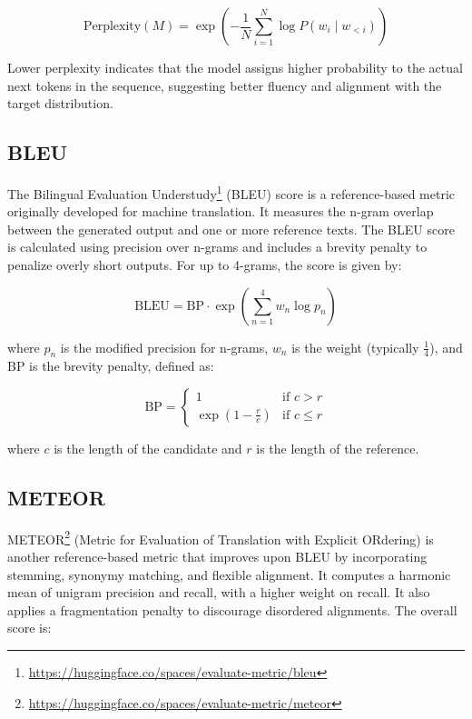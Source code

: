 \begin{equation}
  \text{Perplexity}(M) = \exp\left(-\frac{1}{N} \sum_{i=1}^{N} \log P(w_i \mid w_{<i})\right)
\end{equation}

Lower perplexity indicates that the model assigns higher probability to the actual
next tokens in the sequence, suggesting better fluency and alignment with the target
distribution.

\subsection{BLEU}

The Bilingual Evaluation Understudy\footnote{\url{https://huggingface.co/spaces/evaluate-metric/bleu}} (BLEU) score is a reference-based metric originally
developed for machine translation. It measures the n-gram overlap between the generated
output and one or more reference texts. The BLEU score is calculated using precision
over n-grams and includes a brevity penalty to penalize overly short outputs. For up to
4-grams, the score is given by:

\begin{equation}
  \text{BLEU} = \text{BP} \cdot \exp\left( \sum_{n=1}^{4} w_n \log p_n \right)
\end{equation}

where \( p_n \) is the modified precision for n-grams, \( w_n \) is the weight (typically \( \frac{1}{4} \)), and BP
is the brevity penalty, defined as:

\begin{equation}
  \text{BP} = 
    \begin{cases}
    1 & \text{if } c > r \\
    \exp\left(1 - \frac{r}{c}\right) & \text{if } c \leq r
    \end{cases}
\end{equation}

where \( c \) is the length of the candidate and \( r \) is the length of the reference.

\subsection{METEOR}

METEOR\footnote{\url{https://huggingface.co/spaces/evaluate-metric/meteor}} (Metric for Evaluation of Translation with Explicit ORdering) is another
reference-based metric that improves upon BLEU by incorporating stemming, synonymy
matching, and flexible alignment. It computes a harmonic mean of unigram precision and
recall, with a higher weight on recall. It also applies a fragmentation penalty to discourage
disordered alignments. The overall score is:

